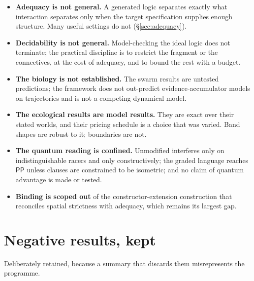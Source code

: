 \begin{itemize}[leftmargin=1.4em]
\item \textbf{Adequacy is not general.} A generated logic separates exactly what
interaction separates only when the target specification supplies enough
structure. Many useful settings do not (\S\ref{sec:adequacy}).
\item \textbf{Decidability is not general.} Model-checking the ideal logic does not
terminate; the practical discipline is to restrict the fragment or the connectives,
at the cost of adequacy, and to bound the rest with a budget.
\item \textbf{The biology is not established.} The swarm results are untested
predictions; the framework does not out-predict evidence-accumulator models on
trajectories and is not a competing dynamical model.
\item \textbf{The ecological results are model results.} They are exact over their
stated worlds, and their pricing schedule is a choice that was varied. Band shapes
are robust to it; boundaries are not.
\item \textbf{The quantum reading is confined.} Unmodified \rhoc{} interferes only
on indistinguishable racers and only constructively; the graded language reaches
$\mathsf{PP}$ unless clauses are constrained to be isometric; and no claim of
quantum advantage is made or tested.
\item \textbf{Binding is scoped out} of the constructor-extension construction
that reconciles spatial strictness with adequacy, which remains its largest gap.
\end{itemize}

\section{Negative results, kept}
\label{sec:negatives}

Deliberately retained, because a summary that discards them misrepresents the
programme.

